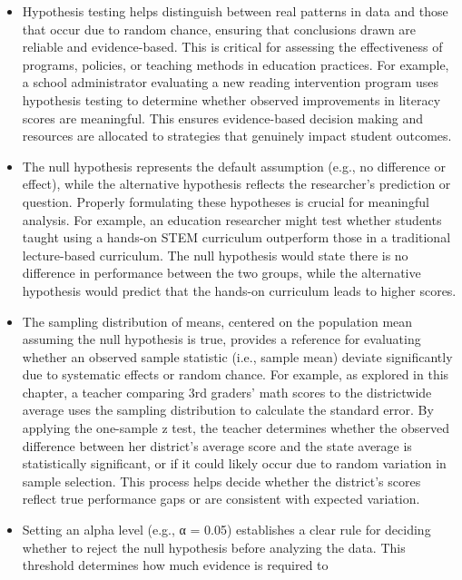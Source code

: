 \documentclass[
  letterpaper,
  DIV=11,
  numbers=noendperiod]{scrreprt}
\begin{document}

\begin{itemize}
\item
  Hypothesis testing helps distinguish between real patterns in data and
  those that occur due to random chance, ensuring that conclusions drawn
  are reliable and evidence-based. This is critical for assessing the
  effectiveness of programs, policies, or teaching methods in education
  practices. For example, a school administrator evaluating a new
  reading intervention program uses hypothesis testing to determine
  whether observed improvements in literacy scores are meaningful. This
  ensures evidence-based decision making and resources are allocated to
  strategies that genuinely impact student outcomes.
\item
  The null hypothesis represents the default assumption (e.g., no
  difference or effect), while the alternative hypothesis reflects the
  researcher's prediction or question. Properly formulating these
  hypotheses is crucial for meaningful analysis. For example, an
  education researcher might test whether students taught using a
  hands-on STEM curriculum outperform those in a traditional
  lecture-based curriculum. The null hypothesis would state there is no
  difference in performance between the two groups, while the
  alternative hypothesis would predict that the hands-on curriculum
  leads to higher scores.
\item
  The sampling distribution of means, centered on the population mean
  assuming the null hypothesis is true, provides a reference for
  evaluating whether an observed sample statistic (i.e., sample mean)
  deviate significantly due to systematic effects or random chance. For
  example, as explored in this chapter, a teacher comparing 3rd graders'
  math scores to the districtwide average uses the sampling distribution
  to calculate the standard error. By applying the one-sample z test,
  the teacher determines whether the observed difference between her
  district's average score and the state average is statistically
  significant, or if it could likely occur due to random variation in
  sample selection. This process helps decide whether the district's
  scores reflect true performance gaps or are consistent with expected
  variation.
\item
  Setting an alpha level (e.g., α = 0.05) establishes a clear rule for
  deciding whether to reject the null hypothesis before analyzing the
  data. This threshold determines how much evidence is required to

\end{itemize}
\end{document}
